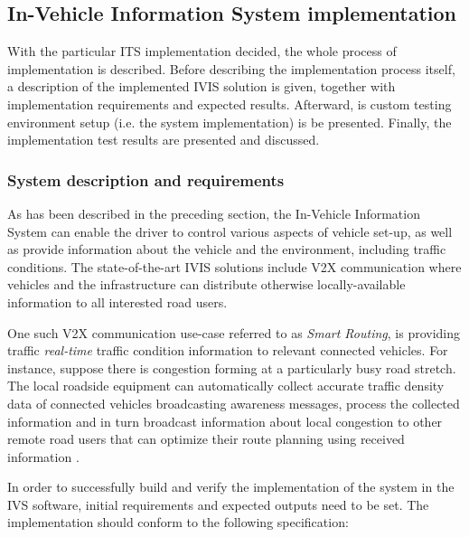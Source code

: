 \documentclass[0main.tex]{subfiles}
\begin{document}
\subsection{In-Vehicle Information System implementation}

With the particular ITS implementation decided, the whole process of implementation is 
described. Before describing the implementation process itself, a description of the 
implemented IVIS solution is given, together with implementation requirements and expected
results. Afterward, is custom testing environment setup (i.e. the system implementation) is %
be presented. Finally, the implementation test results are presented and discussed.

\subsubsection{System description and requirements}

As has been described in the preceding section, the In-Vehicle Information System can enable 
the driver to control various aspects of vehicle set-up, as well as provide information about 
the vehicle and the environment, including traffic conditions. The state-of-the-art IVIS solutions include 
V2X communication where vehicles and the infrastructure can distribute otherwise locally-available 
information to all interested road users. 

One such V2X communication use-case referred to as \emph{Smart Routing}, is providing traffic
\emph{real-time} traffic condition information to relevant connected vehicles. For instance,
suppose there is congestion forming at a particularly busy road stretch. The local roadside
equipment can automatically collect accurate traffic density data of connected vehicles
broadcasting awareness messages, process the collected information and in turn broadcast
information about local congestion to other remote road users that can optimize their route
planning using received information \cite{Kotsi2020}.


In order to successfully build and verify the implementation of the system in the IVS software, 
initial requirements and expected outputs need to be set. The implementation should conform to 
the following specification:
\end{document}
